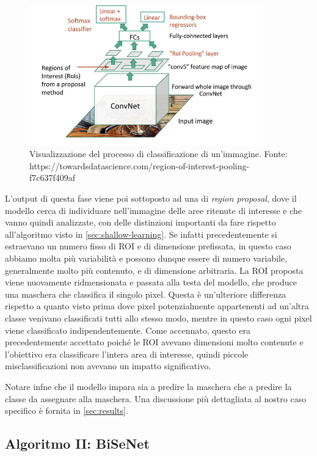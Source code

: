 \begin{figure}[ht]
    \centering
    \includegraphics[width=0.9\textwidth]{./assets/cnn.jpg}
    \caption{\label{fig:cnn}Visualizzazione del processo di classificazione di un'immagine. Fonte: https://towardsdatascience.com/region-of-interest-pooling-f7c637f409af}
\end{figure}

L'output di questa fase viene poi sottoposto ad una di {\it region proposal},
dove il modello cerca di individuare nell'immagine delle aree ritenute di
interesse e che vanno quindi analizzate, con delle distinzioni importanti
da fare rispetto all'algoritmo visto in \ref{sec:shallow-learning}.
Se infatti precedentemente si estraevano un numero fisso di ROI e di
dimensione prefissata, in questo caso abbiamo molta più variabilità e
possono dunque essere di numero variabile, generalmente molto più contenuto,
e di dimensione arbitraria.
La ROI proposta viene nuovamente ridmensionata e passata alla testa del
modello, che produce una maschera che classifica il singolo pixel.
Questa è un'ulteriore differenza rispetto a quanto visto prima dove
pixel potenzialmente appartenenti ad un'altra classe venivano classificati
tutti allo stesso modo, mentre in questo caso ogni pixel viene classificato
indipendentemente.
Come accennato, questo era precedentemente accettato poiché le ROI
avevano dimensioni molto contenute e l'obiettivo era classificare l'intera
area di interesse, quindi piccole misclassificazioni non avevano un impatto
significativo.

Notare infne che il modello impara sia a predire la maschera che a
predire la classe da assegnare alla maschera.
Una discussione più dettagliata al nostro caso specifico è fornita
in \ref{sec:results}.

\subsection{Algoritmo II: BiSeNet}

